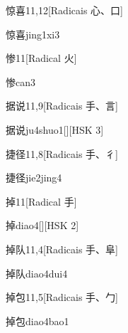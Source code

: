 \begin{entry}{惊喜}{11,12}[Radicais ⼼、⼝]
  \begin{phonetics}{惊喜}{jing1xi3}
  \end{phonetics}
\end{entry}

\begin{entry}{惨}{11}[Radical ⽕]
  \begin{phonetics}{惨}{can3}
  \end{phonetics}
\end{entry}

\begin{entry}{据说}{11,9}[Radicais ⼿、⾔]
  \begin{phonetics}{据说}{ju4shuo1}[][HSK 3]
  \end{phonetics}
\end{entry}

\begin{entry}{捷径}{11,8}[Radicais ⼿、⼻]
  \begin{phonetics}{捷径}{jie2jing4}
  \end{phonetics}
\end{entry}

\begin{entry}{掉}{11}[Radical ⼿]
  \begin{phonetics}{掉}{diao4}[][HSK 2]
  \end{phonetics}
\end{entry}

\begin{entry}{掉队}{11,4}[Radicais ⼿、⾩]
  \begin{phonetics}{掉队}{diao4dui4}
  \end{phonetics}
\end{entry}

\begin{entry}{掉包}{11,5}[Radicais ⼿、⼓]
  \begin{phonetics}{掉包}{diao4bao1}
  \end{phonetics}
\end{entry}

